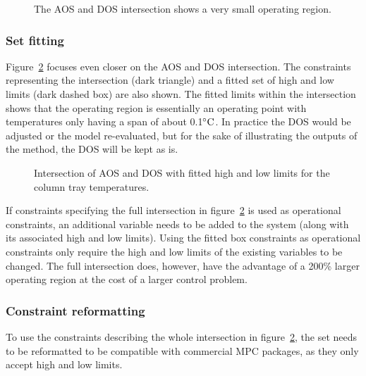 \begin{figure}[htbp]
  \centering
    \scalebox{1}{}  
  \caption[AOS and DOS intersection of the laboratory distillation column]{The AOS and DOS intersection shows a very small operating region.}
  \label{fig:columnaosfocus}
\end{figure}

\subsubsection{Set fitting}
Figure~\ref{fig:columnfitbox} focuses even closer on the AOS and DOS intersection.
The constraints representing the intersection (dark triangle) and a fitted set of high and low limits (dark dashed box) are also shown.
The fitted limits within the intersection shows that the operating region is essentially an operating point with temperatures only having a span of about 0.1$^{\circ}\text{{C}}$.
In practice the DOS would be adjusted or the model re-evaluated, but for the sake of illustrating the outputs of the method, the DOS will be kept as is.
  
\begin{figure}[htbp]
  \centering
    \scalebox{1}{}  
  \caption[Fitted constraints for the laboratory distillation column]{Intersection of AOS and DOS with fitted high and low limits for the column tray temperatures.}
  \label{fig:columnfitbox}
\end{figure}

If constraints specifying the full intersection in figure~\ref{fig:columnfitbox} is used as operational constraints, an additional variable needs to be added to the system (along with its associated high and low limits).
Using the fitted box constraints as operational constraints only require the high and low limits of the existing variables to be changed.
The full intersection does, however, have the advantage of a 200\% larger operating region at the cost of a larger control problem.

\subsubsection{Constraint reformatting}
To use the constraints describing the whole intersection in figure~\ref{fig:columnfitbox}, the set needs to be reformatted to be compatible with commercial MPC packages, as they only accept high and low limits.

